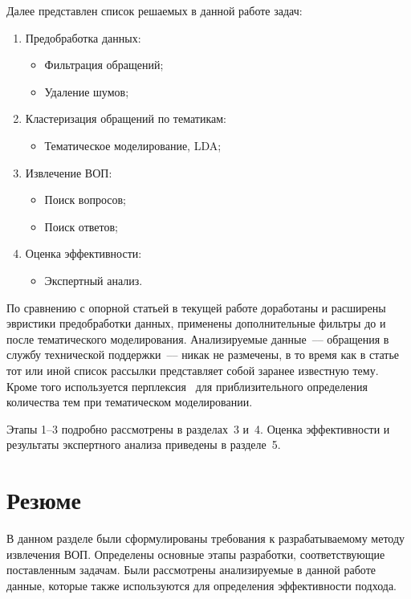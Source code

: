 Далее представлен список решаемых в данной работе задач:

\begin{enumerate}
\item Предобработка данных:
\begin{itemize}
\item Фильтрация обращений;
\item Удаление шумов;
\end{itemize}
\item Кластеризация обращений по тематикам:
\begin{itemize}
\item Тематическое моделирование, LDA;
\end{itemize}
\item Извлечение ВОП:
\begin{itemize}
\item Поиск вопросов;
\item Поиск ответов;
\end{itemize}
\item Оценка эффективности:
\begin{itemize}
\item Экспертный анализ.
\end{itemize}
\end{enumerate}

По сравнению с опорной статьей в текущей работе доработаны и расширены эвристики предобработки данных, применены дополнительные фильтры до и после тематического моделирования. Анализируемые данные~--– обращения в службу технической поддержки~--– никак не размечены, в то время как в статье~\cite{original} тот или иной список рассылки представляет собой заранее известную тему. Кроме того используется перплексия~\cite{LDA} для приблизительного определения количества тем при тематическом моделировании.

Этапы 1--3 подробно рассмотрены в разделах~3 и~4. Оценка эффективности и результаты экспертного анализа приведены в разделе~5.

\section{Резюме}
\label{sec:task_concl}

В данном разделе были сформулированы требования к разрабатываемому методу извлечения ВОП. Определены основные этапы разработки, соответствующие поставленным задачам. Были рассмотрены анализируемые в данной работе данные, которые также используются для определения эффективности подхода.